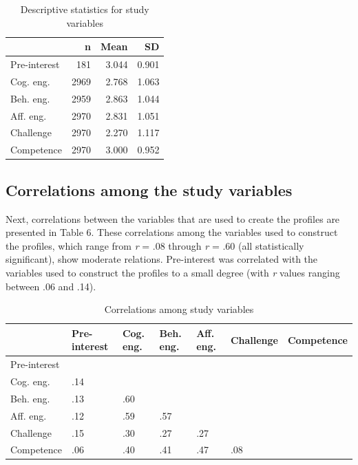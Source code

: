 \documentclass[]{msu-thesis}
\theoremstyle{definition}
\theoremstyle{definition}
\theoremstyle{definition}
\theoremstyle{remark}
\begin{document}
\begin{table}

\caption{\label{tab:unnamed-chunk-7}Descriptive statistics for study variables}
\centering
\begin{tabular}[t]{lrrr}
\toprule
 & n & Mean & SD\\
\midrule
Pre-interest & 181 & 3.044 & 0.901\\
Cog. eng. & 2969 & 2.768 & 1.063\\
Beh. eng. & 2959 & 2.863 & 1.044\\
Aff. eng. & 2970 & 2.831 & 1.051\\
Challenge & 2970 & 2.270 & 1.117\\
Competence & 2970 & 3.000 & 0.952\\
\bottomrule
\end{tabular}
\end{table}

\subsection{Correlations among the study
variables}\label{correlations-among-the-study-variables}

Next, correlations between the variables that are used to create the
profiles are presented in Table 6. These correlations among the
variables used to construct the profiles, which range from \emph{r} =
.08 through \emph{r} = .60 (all statistically significant), show
moderate relations. Pre-interest was correlated with the variables used
to construct the profiles to a small degree (with \emph{r} values
ranging between .06 and .14).

\begin{landscape}\begin{table}

\caption{\label{tab:unnamed-chunk-8}Correlations among study variables}
\centering
\begin{tabular}[t]{lllllll}
\toprule
 & Pre-interest & Cog. eng. & Beh. eng. & Aff. eng. & Challenge & Competence\\
\midrule
Pre-interest &  &  &  &  &  & \\
Cog. eng. & .14 &  &  &  &  & \\
Beh. eng. & .13 & .60 &  &  &  & \\
Aff. eng. & .12 & .59 & .57 &  &  & \\
Challenge & .15 & .30 & .27 & .27 &  & \\
Competence & .06 & .40 & .41 & .47 & .08 & \\
\bottomrule
\end{tabular}
\end{table}
\end{landscape}
\end{document}
